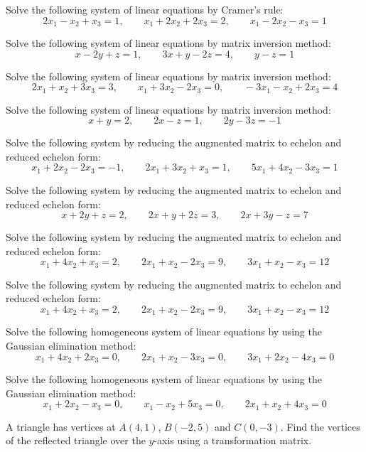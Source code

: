 \documentclass[11pt,a4paper]{article}
\begin{document}
\begin{longlist}
\item Solve the following system of linear equations by Cramer's rule:
\[
2x_1-x_2+x_3=1, \qquad x_1+2x_2+2x_3=2, \qquad x_1-2x_2-x_3=1
\]

\item Solve the following system of linear equations by matrix inversion method:
\[
x-2y+z=1, \qquad 3x+y-2z=4, \qquad y-z=1
\]

\item Solve the following system of linear equations by matrix inversion method:
\[
2x_1+x_2+3x_3=3, \qquad x_1+3x_2-2x_3=0, \qquad -3x_1-x_2+2x_3=4
\]

\item Solve the following system of linear equations by matrix inversion method:
\[
x+y=2, \qquad 2x-z=1, \qquad 2y-3z=-1
\]

\item Solve the following system by reducing the augmented matrix to echelon and reduced echelon form:
\[
x_1+2x_2-2x_3=-1, \qquad 2x_1+3x_2+x_3=1, \qquad 5x_1+4x_2-3x_3=1
\]

\item Solve the following system by reducing the augmented matrix to echelon and reduced echelon form:
\[
x+2y+z=2, \qquad 2x+y+2z=3, \qquad 2x+3y-z=7
\]

\item Solve the following system by reducing the augmented matrix to echelon and reduced echelon form:
\[
x_1+4x_2+x_3=2, \qquad 2x_1+x_2-2x_3=9, \qquad 3x_1+x_2-x_3=12
\]

\item Solve the following system by reducing the augmented matrix to echelon and reduced echelon form:
\[
x_1+4x_2+x_3=2, \qquad 2x_1+x_2-2x_3=9, \qquad 3x_1+x_2-x_3=12
\]

\item Solve the following homogeneous system of linear equations by using the Gaussian elimination method:
\[
x_1+4x_2+2x_3=0, \qquad 2x_1+x_2-3x_3=0, \qquad 3x_1+2x_2-4x_3=0
\]

\item Solve the following homogeneous system of linear equations by using the Gaussian elimination method:
\[
x_1+2x_2-x_3=0, \qquad x_1-x_2+5x_3=0, \qquad 2x_1+x_2+4x_3=0
\]

\item A triangle has vertices at $A(4,1)$, $B(-2,5)$ and $C(0,-3)$. Find the vertices of the reflected triangle over the $y$-axis using a transformation matrix.


\end{longlist}
\end{document}
